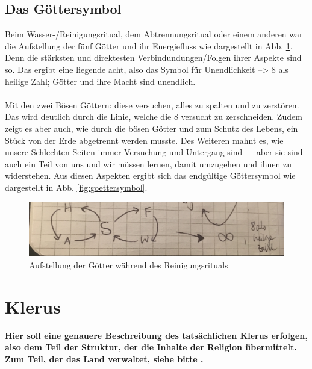 \subsection{Das Göttersymbol} \label{sec:goettersymbol}
Beim Wasser-/Reinigungsritual, dem Abtrennungsritual oder einem anderen war die Aufstellung der fünf Götter und ihr Energiefluss wie dargestellt in Abb. \ref{fig:goetteraufstellung}. 
Denn die stärksten und direktesten Verbindundungen/Folgen ihrer Aspekte sind so. 
Das ergibt eine liegende acht, also das Symbol für Unendlichkeit --> 8 als heilige Zahl; 
Götter und ihre Macht sind unendlich.\\
\\
Mit den zwei Bösen Göttern: diese versuchen, alles zu spalten und zu zerstören. 
Das wird deutlich durch die Linie, welche die 8 versucht zu zerschneiden. 
Zudem zeigt es aber auch, wie durch die bösen Götter und zum Schutz des Lebens, ein Stück von der Erde abgetrennt werden musste. 
Des Weiteren mahnt es, wie unsere Schlechten Seiten immer Versuchung und Untergang sind — aber sie sind auch ein Teil von uns und wir müssen lernen, damit umzugehen und ihnen zu widerstehen. 
Aus diesen Aspekten ergibt sich das endgültige Göttersymbol wie dargestellt in Abb. \ref{fig:goettersymbol}.\\

\begin{figure}
	\centering
	\includegraphics[width=0.7\linewidth]{Abbildungen/Gesellschaft/GoetteraufstellungbeiReinigungsritual}
	\caption{Aufstellung der Götter während des Reinigungsrituals}
	\label{fig:goetteraufstellung}
\end{figure}














\section{Klerus}\label{ch:klerus}
\textbf{Hier soll eine genauere Beschreibung des tatsächlichen Klerus erfolgen, also dem Teil der Struktur, der die Inhalte der Religion übermittelt. 
Zum Teil, der das Land verwaltet, siehe bitte .} 

